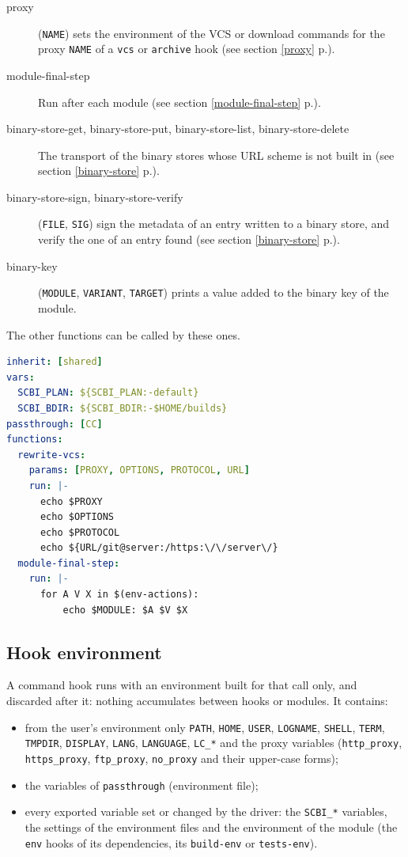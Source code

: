 \documentclass[a4paper,12pt,twoside]{article}
\newcommand{\code}[1]{\texttt{#1}}
\newcommand{\seeref}[1]{see section \ref{#1} p.\pageref{#1}}
\begin{document}
\begin{description}
\begin{description}
		\item[proxy] (\code{NAME}) sets the environment of the VCS or
		download commands for the proxy \code{NAME} of a \code{vcs} or
		\code{archive} hook (\seeref{proxy}).
		\item[module-final-step] Run after each module
		(\seeref{module-final-step}).
		\item[binary-store-get, binary-store-put, binary-store-list, binary-store-delete] The
		transport of the binary stores whose URL scheme is not built in
		(\seeref{binary-store}).
		\item[binary-store-sign, binary-store-verify] (\code{FILE}, \code{SIG})
		sign the metadata of an entry written to a binary store, and verify
		the one of an entry found (\seeref{binary-store}).
		\item[binary-key] (\code{MODULE}, \code{VARIANT}, \code{TARGET})
		prints a value added to the binary key of the module.
	\end{description}
	The other functions can be called by these ones.
\end{description}

\begin{lstlisting}[language={yaml}]
inherit: [shared]
vars:
  SCBI_PLAN: ${SCBI_PLAN:-default}
  SCBI_BDIR: ${SCBI_BDIR:-$HOME/builds}
passthrough: [CC]
functions:
  rewrite-vcs:
    params: [PROXY, OPTIONS, PROTOCOL, URL]
    run: |-
      echo $PROXY
      echo $OPTIONS
      echo $PROTOCOL
      echo ${URL/git@server:/https:\/\/server\/}
  module-final-step:
    run: |-
      for A V X in $(env-actions):
          echo $MODULE: $A $V $X
\end{lstlisting}

\subsection{Hook environment}
\label{hookenv}

A command hook runs with an environment built for that call only, and
discarded after it: nothing accumulates between hooks or modules. It
contains:

\begin{itemize}
	\item from the user's environment only \code{PATH}, \code{HOME},
	\code{USER}, \code{LOGNAME}, \code{SHELL}, \code{TERM}, \code{TMPDIR},
	\code{DISPLAY}, \code{LANG}, \code{LANGUAGE}, \code{LC\_*} and the
	proxy variables (\code{http\_proxy}, \code{https\_proxy},
	\code{ftp\_proxy}, \code{no\_proxy} and their upper-case forms);
	\item the variables of \code{passthrough} (environment file);
	\item every exported variable set or changed by the driver: the
	\code{SCBI\_*} variables, the settings of the environment files and
	the environment of the module (the \code{env} hooks of its
	dependencies, its \code{build-env} or \code{tests-env}).
\end{itemize}
\end{document}
